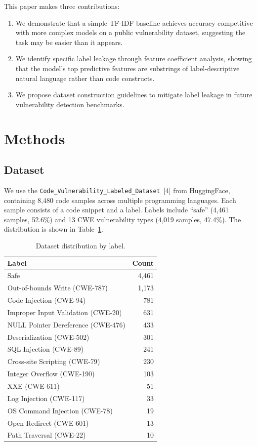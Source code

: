 \documentclass[11pt,a4paper]{article}
\begin{document}
This paper makes three contributions:
\begin{enumerate}
    \item We demonstrate that a simple TF-IDF baseline achieves accuracy competitive with more complex models on a public vulnerability dataset, suggesting the task may be easier than it appears.
    \item We identify specific label leakage through feature coefficient analysis, showing that the model's top predictive features are substrings of label-descriptive natural language rather than code constructs.
    \item We propose dataset construction guidelines to mitigate label leakage in future vulnerability detection benchmarks.
\end{enumerate}

\section{Methods}

\subsection{Dataset}

We use the \texttt{Code\_Vulnerability\_Labeled\_Dataset}~[4] from HuggingFace, containing 8,480 code samples across multiple programming languages. Each sample consists of a code snippet and a label. Labels include ``safe'' (4,461 samples, 52.6\%) and 13 CWE vulnerability types (4,019 samples, 47.4\%). The distribution is shown in Table~\ref{tab:dataset}.

\begin{table}[H]
\centering
\caption{Dataset distribution by label.}
\label{tab:dataset}
\begin{tabular}{lr}
\toprule
\textbf{Label} & \textbf{Count} \\
\midrule
Safe & 4,461 \\
Out-of-bounds Write (CWE-787) & 1,173 \\
Code Injection (CWE-94) & 781 \\
Improper Input Validation (CWE-20) & 631 \\
NULL Pointer Dereference (CWE-476) & 433 \\
Deserialization (CWE-502) & 301 \\
SQL Injection (CWE-89) & 241 \\
Cross-site Scripting (CWE-79) & 230 \\
Integer Overflow (CWE-190) & 103 \\
XXE (CWE-611) & 51 \\
Log Injection (CWE-117) & 33 \\
OS Command Injection (CWE-78) & 19 \\
Open Redirect (CWE-601) & 13 \\
Path Traversal (CWE-22) & 10 \\
\bottomrule
\end{tabular}
\end{table}
\end{document}
